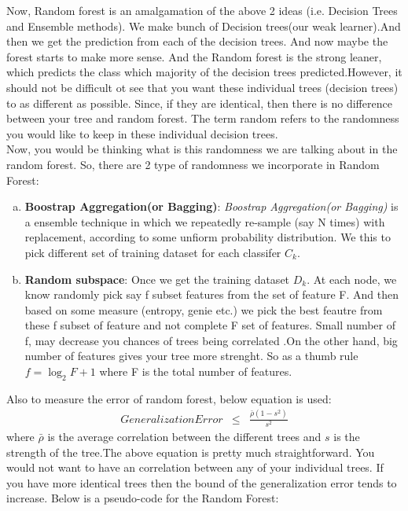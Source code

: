 \documentclass[journal]{IEEEtran}
\begin{document}
Now, Random forest is an amalgamation of the above 2 ideas (i.e. Decision Trees and Ensemble methods). We make bunch of Decision trees(our weak learner).And then we get the prediction from each of the decision trees. And now maybe the forest starts to make more sense. And the Random forest is the strong leaner, which predicts the class which majority of the decision trees predicted.However, it should not be difficult ot see that you want these individual trees (decision trees) to as different as possible. Since, if they are identical, then there is no difference between your tree and random forest. The term random refers to the randomness you would like to keep in these individual decision trees. \\
Now, you would be thinking what is this randomness we are talking about in the random forest. So, there are 2 type of randomness we incorporate in Random Forest:
\begin{enumerate}[a.]
	\item \textbf{Boostrap Aggregation(or Bagging)}: \emph{Boostrap Aggregation(or Bagging)} is a ensemble technique in which we repeatedly  re-sample (say N times) with replacement, according to some unfiorm probability distribution. We this to pick different set of training dataset for each classifer $C_{k}$.
	\item \textbf{Random subspace}: Once we get the training dataset $D_{k}$. At each node, we know randomly pick say f subset features from the set of feature F. And then based on some measure (entropy, genie etc.) we pick the best feautre from these f subset of feature and not complete F set of features. Small number of f, may decrease you chances of trees being correlated .On the other hand, big number of features gives your tree more strenght. So as a thumb rule $f = \log_2F+1$ where F is the total number of features.
\end{enumerate}
Also to measure the error of random forest, below equation is used:
\begin{eqnarray}
Generalization Error &\le&  \frac{\bar{\rho}(1-s^2)}{s^2}
\end{eqnarray}
where $\bar{\rho}$ is the average correlation between the different trees and $s$ is the strength of the tree.The above equation is pretty much straightforward. You would not want to have an correlation between any of your individual trees. If you have more identical trees then the bound of the generalization error tends to increase.
Below is a pseudo-code for the Random Forest:
\end{document}
